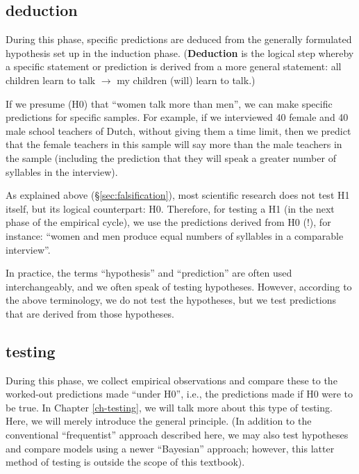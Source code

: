 \documentclass[
]{book}
\begin{document}
\hypertarget{deduction}{%
\subsection{deduction}\label{deduction}}

During this phase, specific predictions are deduced from the generally formulated hypothesis set up in the induction phase. (\textbf{Deduction} is the logical step whereby a specific statement or prediction is derived from a more general statement: all children learn to talk \(\rightarrow\) my children (will) learn to talk.)

If we presume (H0) that ``women talk more than men'', we can make specific predictions for specific samples. For example, if we interviewed 40 female and 40 male school teachers of Dutch, without giving them a time limit, then we predict that the female teachers in this sample will say more than the male teachers in the sample (including the prediction that they will speak a greater number of syllables in the interview).

As explained above (§\ref{sec:falsification}), most scientific research does not test H1 itself, but its logical counterpart: H0. Therefore, for testing a H1 (in the next phase of the empirical cycle), we use the predictions derived from H0 (!), for instance: ``women and men produce equal numbers of syllables in a comparable interview''.

In practice, the terms ``hypothesis'' and ``prediction'' are often used interchangeably, and we often speak of testing hypotheses. However, according to the above terminology, we do not test the hypotheses, but we test predictions that are derived from those hypotheses.

\hypertarget{testing}{%
\subsection{testing}\label{testing}}

During this phase, we collect empirical observations and compare these to the worked-out predictions made ``under H0'', i.e., the predictions made if H0 were to be true. In Chapter \ref{ch-testing}, we will talk more about this type of testing. Here, we will merely introduce the general principle.
(In addition to the conventional ``frequentist'' approach described here, we may also test hypotheses and compare models using a newer ``Bayesian'' approach; however, this latter method of testing is outside the scope of this textbook).
\end{document}
